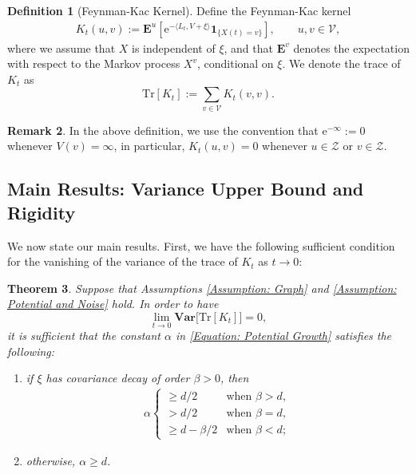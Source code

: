 \documentclass{amsart}
\numberwithin{equation}{section}
\newtheorem{theorem}{Theorem}[section]
\theoremstyle{definition}
\newtheorem{definition}[theorem]{Definition}
\newtheorem{remark}[theorem]{Remark}
\newcommand\al{\alpha}
\newcommand\be{\beta}
\newcommand\mbf{\mathbf}
\newcommand\mr{\mathrm}
\newcommand\ms{\mathscr}
\begin{document}
%


%

\begin{definition}[Feynman-Kac Kernel]
Define the Feynman-Kac kernel
\begin{align}
\label{Equation: Kernel}
K_t(u,v):=
\mbf E^u\left[\mr e^{-\langle L_t,V+\xi\rangle}\mbf 1_{\{X(t)=v\}}\right],\qquad u,v\in\ms V,
\end{align}
where we assume that $X$ is independent of $\xi$,
and that $\mbf E^v$ denotes the expectation with respect to
the Markov process $X^v$, conditional on $\xi$.
We denote the trace of $K_t$ as
\[\mr{Tr}[K_t]:=\sum_{v\in\ms V}K_t(v,v).\]
\end{definition}

%

\begin{remark}
In the above definition,
we use the convention that $\mr e^{-\infty}:=0$ whenever $V(v)=\infty$,
in particular, $K_t(u,v)=0$ whenever $u\in\ms Z$ or $v\in\ms Z$.
\end{remark}

%

\subsection{Main Results: Variance Upper Bound and Rigidity}

%

We now state our main results. First, we have the following sufficient condition
for the vanishing of the variance of the trace of $K_t$ as $t\to0$:

%

\begin{theorem}
\label{Theorem: Upper}
Suppose that Assumptions \ref{Assumption: Graph} and \ref{Assumption: Potential and Noise} hold.
In order to have
\[\lim_{t\to0}\mbf{Var}\big[\mr{Tr}[K_t]\big]=0,\]
it is sufficient that the constant $\al$ in \eqref{Equation: Potential Growth}
satisfies the following:
\begin{enumerate}
\item if $\xi$ has covariance decay of order $\be>0$, then
\begin{align}
\label{Equation: Polynomial Growth Condition}
\al\begin{cases}
\geq d/2&\text{when }\be>d,\\
>d/2&\text{when }\be=d,\\
\geq d-\be/2&\text{when }\be<d;
\end{cases}
\end{align}
\item otherwise, $\al\geq d$.
\end{enumerate}
\end{theorem}
\end{document}
